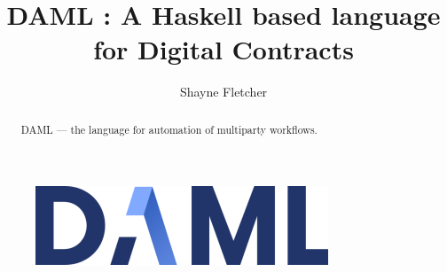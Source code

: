 \documentclass[acmsmall]{acmart}
\begin{document}
\title{DAML : A Haskell based language for Digital Contracts}

%
\author{Shayne Fletcher}

\renewcommand{\shortauthors}{Shayne Fletcher}

\begin{figure}[H]
\centering
\includegraphics{img/DAML_330x89.png}
\end{figure}

\begin{abstract}
DAML --- the language for automation of multiparty workflows.
\end{abstract}

%
%
\end{document}
